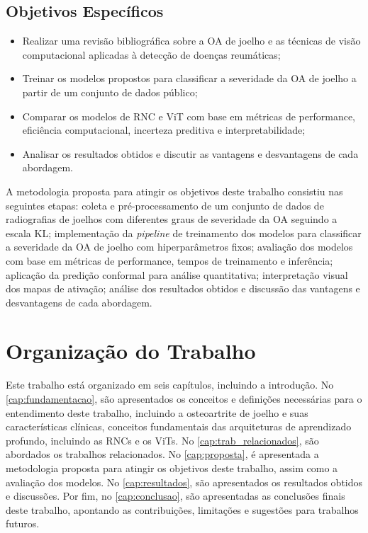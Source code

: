 \subsection{Objetivos Específicos}

\begin{itemize}
    \item Realizar uma revisão bibliográfica sobre a OA de joelho e as técnicas de visão computacional aplicadas à detecção de doenças reumáticas;
    \item Treinar os modelos propostos para classificar a severidade da OA de joelho a partir de um conjunto de dados público;
    \item Comparar os modelos de RNC e ViT com base em métricas de performance, eficiência computacional, incerteza preditiva e interpretabilidade;
    \item Analisar os resultados obtidos e discutir as vantagens e desvantagens de cada abordagem.
\end{itemize}

A metodologia proposta para atingir os objetivos deste trabalho consistiu nas seguintes etapas: coleta e pré-processamento de um conjunto de dados de radiografias de joelhos com diferentes graus de severidade da OA seguindo a escala KL; implementação da \textit{pipeline} de treinamento dos modelos para classificar a severidade da OA de joelho com hiperparâmetros fixos; avaliação dos modelos com base em métricas de performance, tempos de treinamento e inferência; aplicação da predição conformal para análise quantitativa; interpretação visual dos mapas de ativação; análise dos resultados obtidos e discussão das vantagens e desvantagens de cada abordagem.

\section{Organização do Trabalho}

Este trabalho está organizado em seis capítulos, incluindo a introdução. No \autoref{cap:fundamentacao}, são apresentados os conceitos e definições necessárias para o entendimento deste trabalho, incluindo a osteoartrite de joelho e suas características clínicas, conceitos fundamentais das arquiteturas de aprendizado profundo, incluindo as RNCs e os ViTs. No \autoref{cap:trab_relacionados}, são abordados os trabalhos relacionados. No \autoref{cap:proposta}, é apresentada a metodologia proposta para atingir os objetivos deste trabalho, assim como a avaliação dos modelos. No \autoref{cap:resultados}, são apresentados os resultados obtidos e discussões. Por fim, no \autoref{cap:conclusao}, são apresentadas as conclusões finais deste trabalho, apontando as contribuições, limitações e sugestões para trabalhos futuros.